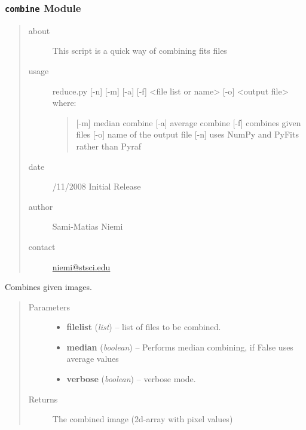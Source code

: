 \documentclass[letterpaper,10pt,english]{sphinxmanual}
\begin{document}
\subsubsection{\texttt{combine} Module}
\label{SamPy.fits:combine-module}\label{SamPy.fits:module-SamPy.fits.combine}
\begin{quote}\begin{description}
\item[{about}] \leavevmode
This script is a quick way of combining fits files

\item[{usage}] \leavevmode
reduce.py {[}-n{]} {[}-m{]} {[}-a{]} {[}-f{]} \textless{}file list or name\textgreater{} {[}-o{]} \textless{}output file\textgreater{}
where:
\begin{quote}

{[}-m{]} median combine
{[}-a{]} average combine
{[}-f{]} combines given files
{[}-o{]} name of the output file
{[}-n{]} uses NumPy and PyFits rather than Pyraf
\end{quote}

\item[{date}] /11/2008 Initial Release

\item[{author}] \leavevmode
Sami-Matias Niemi

\item[{contact}] \leavevmode
\href{mailto:niemi@stsci.edu}{niemi@stsci.edu}

\end{description}\end{quote}


\begin{fulllineitems}
\label{SamPy.fits:SamPy.fits.combine.combine}
Combines given images.
\begin{quote}\begin{description}
\item[{Parameters}] \leavevmode\begin{itemize}
\item {} 
\textbf{filelist} (\emph{list}) -- list of files to be combined.

\item {} 
\textbf{median} (\emph{boolean}) -- Performs median combining, if False uses average values

\item {} 
\textbf{verbose} (\emph{boolean}) -- verbose mode.

\end{itemize}

\item[{Returns}] \leavevmode
The combined image (2d-array with pixel values)

\end{description}\end{quote}

\end{fulllineitems}
\end{document}

